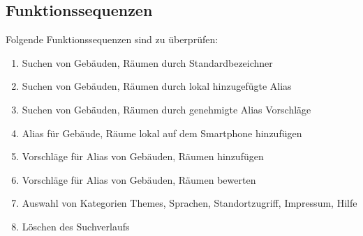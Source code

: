 \subsection{Funktionssequenzen}

Folgende Funktionssequenzen sind zu überprüfen:
\begin{enumerate}[label=\textbf{/T\arabic*0/}, align=left]
	\item Suchen von Gebäuden, Räumen durch Standardbezeichner
	\item Suchen von Gebäuden, Räumen durch lokal hinzugefügte Alias
	\item Suchen von Gebäuden, Räumen durch genehmigte Alias Vorschläge
	\item Alias für Gebäude, Räume lokal auf dem Smartphone hinzufügen
	\item Vorschläge für Alias von Gebäuden, Räumen hinzufügen
	\item Vorschläge für Alias von Gebäuden, Räumen bewerten
	\item Auswahl von Kategorien Themes, Sprachen, Standortzugriff, Impressum, Hilfe
	\item Löschen des Suchverlaufs
\end{enumerate}